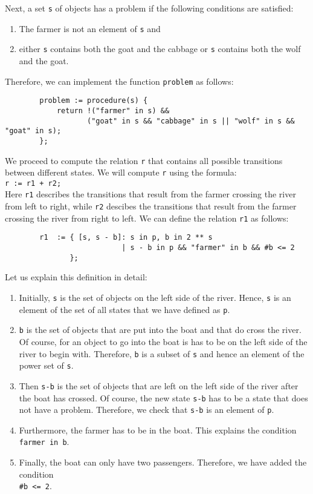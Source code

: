 Next, a set \texttt{s} of objects has a problem if the following conditions
are satisfied:
\begin{enumerate}
\item The farmer is not an element of \texttt{s} and
\item either \texttt{s} contains both the goat and the cabbage or \texttt{s} contains both the wolf and the goat.
\end{enumerate}
Therefore, we can implement the function \texttt{problem} as follows:
\begin{verbatim}
        problem := procedure(s) {
            return !("farmer" in s) &&
                   ("goat" in s && "cabbage" in s || "wolf" in s && "goat" in s);
        };
\end{verbatim}
We proceed to compute the relation \texttt{r} that contains all possible transitions between
different states.  We will compute \texttt{r} using the formula:
\\[0.2cm]
\hspace*{1.3cm}
\texttt{r := r1 + r2;}
\\[0.2cm]
Here \texttt{r1} describes the transitions that result from the farmer crossing the river from left
to right, while \texttt{r2} descibes the transitions that result from the farmer crossing the river
from right to left.  We can define the relation \texttt{r1} as follows:
\begin{verbatim}
        r1  := { [s, s - b]: s in p, b in 2 ** s
                           | s - b in p && "farmer" in b && #b <= 2
               };
\end{verbatim}
Let us explain this definition in detail:
\begin{enumerate}
\item Initially, \texttt{s} is the set of objects on the left side of the river.  Hence, \texttt{s}
      is an element of the set of all states that we have defined as \texttt{p}.
\item \texttt{b} is the set of objects that are put into the boat and that do cross the river.  Of
      course, for an object to go into the boat is has to be on the left side of the river to begin
      with.  Therefore, \texttt{b} is a subset of \texttt{s} and hence an element of the power set
      of \texttt{s}. 
\item Then  \texttt{s-b} is the set of objects that are left on the left side of the river after
      the boat has crossed.  Of course, the new state \texttt{s-b} has to be a state that does not
      have a problem.  Therefore, we check that \texttt{s-b} is an element of \texttt{p}.
\item Furthermore, the farmer has to be in the boat.  This explains the condition 
      \\[0.2cm]
      \hspace*{1.3cm}
      \texttt{farmer in b}.
\item Finally, the boat can only have two passengers.  Therefore, we have added the condition
      \\[0.2cm]
      \hspace*{1.3cm}
      \texttt{\#b <= 2}.
\end{enumerate}
